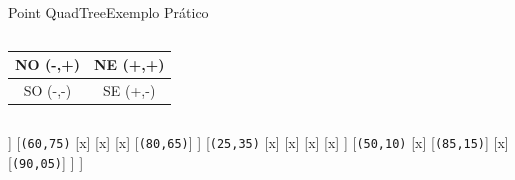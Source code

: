 \documentclass[red, tikz, aspectratio=169, xcolor=dvipsnames]{beamer}
\begin{document}
			\begin{frame}[fragile]{Point QuadTree}{Exemplo Prático}
				\centering
				\vspace{-40px}
				\begin{columns}
					\begin{column}{0.48\textwidth}
						\centering
						\begin{tabular}{|c|c|}
							\hline 
							NO (-,+) & NE (+,+) \\ 
							\hline 
							SO (-,-) & SE (+,-) \\ 
							\hline 
						\end{tabular} 
					\end{column}
					\begin{column}{0.5\textwidth}
						\centering
						\fbox{
							\begin{forest}
								[\texttt{(x,y)}
								[NO]
								[NE]
								[SO]
								[SE]
								]
						\end{forest}}
					\end{column}
				\end{columns}
				\vspace{10px}
				
				\vspace{10px}
				
				\begin{minipage}{\textwidth}
					\centering
					\begin{forest}
						[\texttt{(35,40)}
						[\texttt{(05,45)}
						[x]
						[x]
						[x]
						[x]
						]
						[\texttt{(60,75)}
						[x]
						[x]
						[x]
						[\texttt{(80,65)}]
						]
						[\texttt{(25,35)}
						[x]
						[x]
						[x]
						[x]
						]
						[\texttt{(50,10)}
						[x]
						[\texttt{(85,15)}]
						[x]
						[\texttt{(90,05)}]
						]
						]
					\end{forest}
				\end{minipage}
			\end{frame}
			
\end{document}
